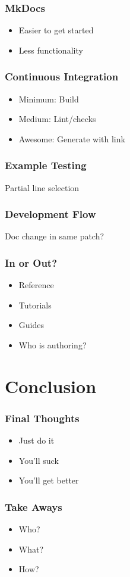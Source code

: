 \begin{frame}
\frametitle{MkDocs}

\begin{itemize}
\item Easier to get started
\item Less functionality
\end{itemize}

\end{frame}

\begin{frame}
\frametitle{Continuous Integration}

\begin{itemize}
\item Minimum: Build
\item Medium: Lint/checks
\item Awesome: Generate with link
\end{itemize}

\end{frame}

\begin{frame}
\frametitle{Example Testing}

Partial line selection
\end{frame}


\begin{frame}
\frametitle{Development Flow}

Doc change in same patch?
\end{frame}

\begin{frame}
\frametitle{In or Out?}

\begin{itemize}
\item Reference
\item Tutorials
\item Guides
\item Who is authoring?
\end{itemize}

\end{frame}

\section{Conclusion}

\begin{frame}
\frametitle{Final Thoughts}

\begin{itemize}
\item Just do it
\item You'll suck
\item You'll get better
\end{itemize}

\end{frame}

\begin{frame}
\frametitle{Take Aways}

\begin{itemize}
\item Who?
\item What?
\item How?
\end{itemize}

\end{frame}


